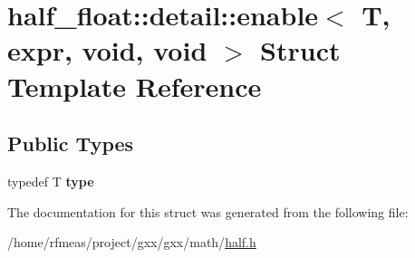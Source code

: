\hypertarget{structhalf__float_1_1detail_1_1enable_3_01T_00_01expr_00_01void_00_01void_01_4}{}\section{half\+\_\+float\+:\+:detail\+:\+:enable$<$ T, expr, void, void $>$ Struct Template Reference}
\label{structhalf__float_1_1detail_1_1enable_3_01T_00_01expr_00_01void_00_01void_01_4}
\subsection*{Public Types}
\begin{DoxyCompactItemize}
\item 
typedef T {\bfseries type}\hypertarget{structhalf__float_1_1detail_1_1enable_3_01T_00_01expr_00_01void_00_01void_01_4_a304f0491d60b73a0be25ff00b24e3bc0}{}\label{structhalf__float_1_1detail_1_1enable_3_01T_00_01expr_00_01void_00_01void_01_4_a304f0491d60b73a0be25ff00b24e3bc0}

\end{DoxyCompactItemize}


The documentation for this struct was generated from the following file\+:\begin{DoxyCompactItemize}
\item 
/home/rfmeas/project/gxx/gxx/math/\hyperlink{half_8h}{half.\+h}\end{DoxyCompactItemize}
